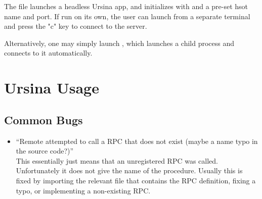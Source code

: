 \documentclass{article}
\begin{document}
The file  launches a headless Ursina app, and initializes
 with  and a pre-set hsot name and port.
If run on its own, the user can launch  from a separate
terminal and press the "c" key to connect to the server.

Alternatively, one may simply launch , which launches a child
 process and connects to it automatically.

\section{Ursina Usage}
\subsection{Common Bugs}
\begin{itemize}
    \item ``Remote attempted to call a RPC that does not exist (maybe a name typo in the source code?)''\\
        This essentially just means that an unregistered RPC was called. Unfortunately it does not give
        the name of the procedure. Usually this is fixed by importing the relevant file that contains the
        RPC definition, fixing a typo, or implementing a non-existing RPC.
\end{itemize}
\end{document}
